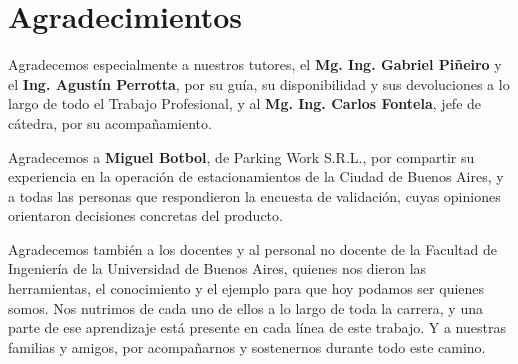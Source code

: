 \newpage
\section{Agradecimientos}\label{sec:agradecimientos}
\enlargethispage{\baselineskip}

\providecommand{\textopendiente}[1]{{\color{gray}\textit{[#1]}}}


Agradecemos especialmente a nuestros tutores, el \textbf{Mg. Ing. Gabriel Piñeiro} y el \textbf{Ing. Agustín Perrotta}, por su guía, su disponibilidad y sus devoluciones a lo largo de todo el Trabajo Profesional, y al \textbf{Mg. Ing. Carlos Fontela}, jefe de cátedra, por su acompañamiento.

Agradecemos a \textbf{Miguel Botbol}, de Parking Work S.R.L., por compartir su experiencia en la operación de estacionamientos de la Ciudad de Buenos Aires, y a todas las personas que respondieron la encuesta de validación, cuyas opiniones orientaron decisiones concretas del producto.

Agradecemos también a los docentes y al personal no docente de la Facultad de Ingeniería de la Universidad de Buenos Aires, quienes nos dieron las herramientas, el conocimiento y el ejemplo para que hoy podamos ser quienes somos. Nos nutrimos de cada uno de ellos a lo largo de toda la carrera, y una parte de ese aprendizaje está presente en cada línea de este trabajo. Y a nuestras familias y amigos, por acompañarnos y sostenernos durante todo este camino.


